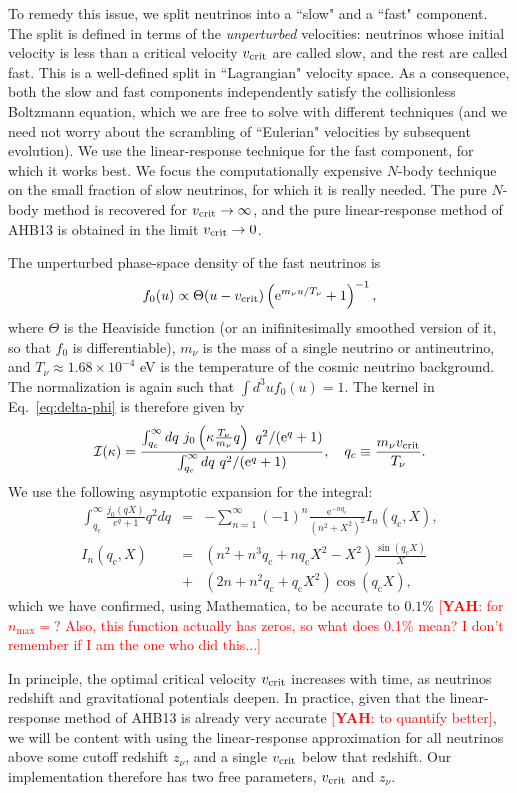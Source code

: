 \documentclass[useAMS, usenatbib]{mnras}
\newcommand{\beq}{\begin{equation}}
\newcommand{\eeq}{\end{equation}}
\newcommand{\barr}{\begin{eqnarray}}
\newcommand{\earr}{\end{eqnarray}}
\newcommand{\rme}{\textrm{e}}
\newcommand{\yah}[1]{{\textcolor{red}{[{\bf YAH}: #1]}}}
\begin{document}
To remedy this issue, we split neutrinos into a ``slow" and a ``fast" component. The split is defined in terms of the \emph{unperturbed} velocities: neutrinos whose initial velocity is less than a critical velocity $v_{\rm crit}$ are called slow, and the rest are called fast. This is a well-defined split in ``Lagrangian" velocity space. As a consequence, both the slow and fast components independently satisfy the collisionless Boltzmann equation, which we are free to solve with different techniques (and we need not worry about the scrambling of ``Eulerian" velocities by subsequent evolution). We use the linear-response technique for the fast component, for which it works best. We focus the computationally expensive $N$-body technique on the small fraction of slow neutrinos, for which it is really needed. The pure $N$-body method is recovered for $v_{\rm crit} \rightarrow \infty$, and the pure linear-response method of AHB13 is obtained in the limit $v_{\rm crit} \rightarrow 0$. 

The unperturbed phase-space density of the fast neutrinos is 
\beq
f_0(u) \propto \Theta(u - v_{\rm crit}) \left(\rme^{m_\nu u/T_\nu} + 1 \right)^{-1},
\eeq
where $\Theta$ is the Heaviside function (or an inifinitesimally smoothed version of it, so that $f_0$ is differentiable), $m_\nu$ is the mass of a single neutrino or antineutrino, and $T_\nu \approx 1.68 \times 10^{-4}$ eV is the temperature of the cosmic neutrino background. The normalization is again such that $\int d^3 u f_0(u) = 1$. The kernel in Eq.~\eqref{eq:delta-phi} is therefore given by
\barr
\mathcal{I}(\kappa) = \frac{\int_{q_c}^{\infty} dq~ j_0\left(\kappa \frac{T_\nu}{m_\nu}q\right)~ q^2 /(\rme^q + 1) }{\int_{q_c}^{\infty} dq ~q^2/(\rme^q + 1)}, \ \ \ q_c \equiv \frac{m_\nu v_{\rm crit}}{T_\nu}.
\earr
We use the following asymptotic expansion for the integral:
\barr
 \int^\infty_{q_\mathrm{c}} \frac{j_0(qX)}{e^q + 1} q^2 dq &=& - \sum^{\infty}_{n=1} (-1)^n \frac{\rme^{-n q_\mathrm{c}}}{(n^2+X^2)^2} I_n(q_\mathrm{c},X),\\
 I_n(q_\mathrm{c},X) &=& (n^2 + n^3 q_\mathrm{c} + n q_\mathrm{c} X^2 - X^2) \frac{\sin(q_\mathrm{c} X)}{X} \nonumber \\
 &+& (2n + n^2 q_\mathrm{c} + q_\mathrm{c} X^2) \cos(q_\mathrm{c} X),
\earr
which we have confirmed, using Mathematica, to be accurate to $0.1\%$ \yah{for $n_{\max} = ?$ Also, this function actually has zeros, so what does 0.1\% mean? I don't remember if I am the one who did this...}

In principle, the optimal critical velocity $v_{\rm crit}$ increases with time, as neutrinos redshift and gravitational potentials deepen. In practice, given that the linear-response method of AHB13 is already very accurate \yah{to quantify better}, we will be content with using the linear-response approximation for all neutrinos above some cutoff redshift $z_{\nu}$, and a single $v_{\rm crit}$ below that redshift. Our implementation therefore has two free parameters, $v_{\rm crit}$ and $z_{\nu}$. 
\end{document}
